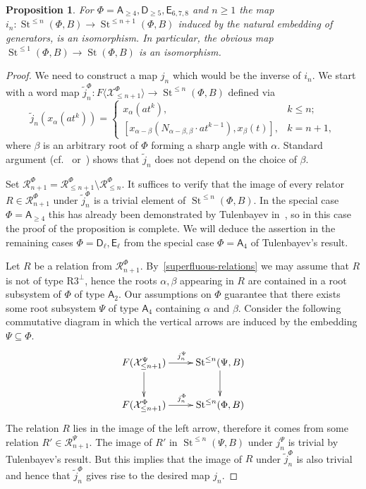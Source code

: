 \documentclass[oneside, 8pt]{amsart}
\newtheorem{prop}[lemma]{Proposition}
\theoremstyle{remark}
\theoremstyle{definition}
\numberwithin{lemma}{section}
\numberwithin{prop}{section}
\numberwithin{corollary}{section}
\DeclareMathOperator{\St}{St}
\newcommand{\rA}{\mathsf{A}}
\newcommand{\rD}{\mathsf{D}}
\newcommand{\rE}{\mathsf{E}}
\numberwithin{equation}{section}
\begin{document}
\begin{prop} \label{lemma33} For $\Phi=\rA_{\geq 4}, \rD_{\geq 5}, \rE_{6,7,8}$ and $n \geq 1$ the map $i_n\colon \St^{\leq n}(\Phi, B) \to \St^{\leq n+1}(\Phi, B)$ induced by the natural embedding of generators, is an isomorphism. In particular, the obvious map $\St^{\leq 1}(\Phi, B) \to \St(\Phi, B)$ is an isomorphism. \end{prop}
\begin{proof}
 We need to construct a map $j_n$ which would be the inverse of $i_n$. 
 We start with a word map $\widetilde{j}_n^\Phi \colon F\langle \mathcal{X}^\Phi_{\leq n+1} \rangle \to \St^{\leq n}(\Phi, B)$ defined via
 \[ \widetilde{j}_n(x_\alpha(at^k)) = \begin{cases} x_\alpha(at^k), & k\leq n; \\
      [x_{\alpha - \beta} (N_{\alpha-\beta, \beta} \cdot at^{k-1}), x_{\beta}(t)], & k = n+1, \end{cases} \]
 where $\beta$ is an arbitrary root of $\Phi$ forming a sharp angle with $\alpha$.
 Standard argument (cf.~\cite[Proposition~1.1]{Re75} or~\cite[Proposition~3.2.2]{RS76}) shows that $\widetilde{j}_n$ does not depend on the choice of $\beta$.
 
 Set $\mathcal{R}^\Phi_{n+1} = \mathcal{R}^\Phi_{\leq n+1} \setminus \mathcal{R}^\Phi_{\leq n}$. It suffices to verify that the image of every relator $R \in \mathcal{R}^\Phi_{n+1}$ under $\widetilde{j}^\Phi_n$ is a trivial element of $\St^{\leq n}(\Phi, B)$. In the special case $\Phi=\rA_{\geq 4}$ this has already been demonstrated by Tulenbayev in~\cite[Lemma~3.3]{Tu83}, so in this case the proof of the proposition is complete. We will deduce the assertion in the remaining cases $\Phi=\rD_\ell,\rE_\ell$ from the special case $\Phi=\rA_4$ of Tulenbayev's result.
 
 Let $R$ be a relation from $\mathcal{R}^\Phi_{n+1}$. By~\cref{superfluous-relations} we may assume that $R$ is not of type $\text{R3}^\bot$, hence the roots $\alpha, \beta$ appearing in $R$ are contained in a root subsystem of $\Phi$ of type $\rA_2$. Our assumptions on $\Phi$ guarantee that there exists some root subsystem $\Psi$ of type $\rA_4$ containing $\alpha$ and $\beta$. Consider the following commutative diagram in which the vertical arrows are induced by the embedding $\Psi\subseteq\Phi$. 
  \begin{equation} \nonumber \xymatrix{
 F(\mathcal{X}_{\leq n+1}^\Psi) \ar[r]^{j_n^\Psi} \ar[d] & \St^{\leq n}(\Psi, B) \ar[d] \\
 F(\mathcal{X}_{\leq n+1}^\Phi) \ar[r]^{j_n^\Phi} & \St^{\leq n}(\Phi, B) }
 \end{equation}
The relation $R$ lies in the image of the left arrow, therefore it comes from some relation $R' \in \mathcal{R}^\Psi_{n+1}$. The image of $R'$ in $\St^{\leq n}(\Psi, B)$ under $j_n^\Psi$ is trivial by Tulenbayev's result. But this implies that the image of $R$ under $\widetilde{j}_n^\Phi$ is also trivial and hence that $\widetilde{j}_n^\Phi$ gives rise to the desired map $j_n$.
\end{proof}
\end{document}
